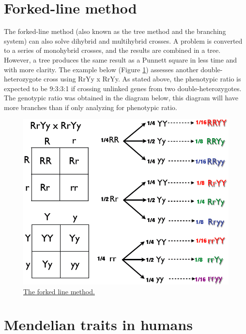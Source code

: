 \hypertarget{forked-line-method}{%
\section{Forked-line method}\label{forked-line-method}}

The forked-line method (also known as the tree method and the branching system) can also solve dihybrid and multihybrid crosses. A problem is converted to a series of monohybrid crosses, and the results are combined in a tree. However, a tree produces the same result as a Punnett square in less time and with more clarity. The example below (Figure \ref{fig:forkedline}) assesses another double-heterozygote cross using RrYy x RrYy. As stated above, the phenotypic ratio is expected to be 9:3:3:1 if crossing unlinked genes from two double-heterozygotes. The genotypic ratio was obtained in the diagram below, this diagram will have more branches than if only analyzing for phenotypic ratio.



\begin{figure}

{\centering \includegraphics[width=0.7\linewidth]{./figures/mendel/Dihybrid_Cross_Tree_Method} 

}

\caption{\href{https://commons.wikimedia.org/wiki/File:Dihybrid_Cross_Tree_Method.png}{The forked line method.}}\label{fig:forkedline}
\end{figure}

\hypertarget{mendelian-traits-in-humans}{%
\section{Mendelian traits in humans}\label{mendelian-traits-in-humans}}

